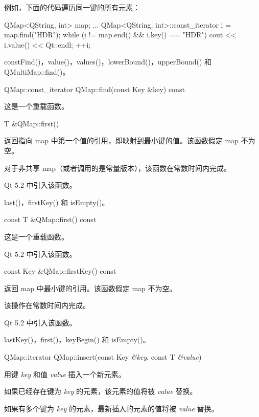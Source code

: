 例如，下面的代码遍历同一键的所有元素：

\begin{cppcode}
QMap<QString, int> map;
...
QMap<QString, int>::const_iterator i = map.find("HDR");
while (i != map.end() && i.key() == "HDR") {
    cout << i.value() << Qt::endl;
    ++i;
}
\end{cppcode}

\begin{seeAlso}
constFind()，value()，values()，lowerBound()，upperBound() 和 QMultiMap::find()。
\end{seeAlso}

\splitLine

QMap::const\_iterator QMap::find(const Key \&key) const

这是一个重载函数。

\splitLine

T \&QMap::first()

返回指向 map 中第一个值的引用，即映射到最小键的值。该函数假定 map 不为空。

对于非共享 map（或者调用的是常量版本），该函数在常数时间内完成。

Qt 5.2 中引入该函数。


\begin{seeAlso}
last()，firstKey() 和 isEmpty()。
\end{seeAlso}

\splitLine

const T \&QMap::first() const

这是一个重载函数。

Qt 5.2 中引入该函数。

\splitLine

const Key \&QMap::firstKey() const

返回 map 中最小键的引用。该函数假定 map 不为空。

该操作在常数时间内完成。

Qt 5.2 中引入该函数。


\begin{seeAlso}
lastKey()，first()，keyBegin() 和 isEmpty()。
\end{seeAlso}

\splitLine

QMap::iterator QMap::insert(const Key \emph{\&key}, const T \emph{\&value})

用键 \emph{key} 和值 \emph{value} 插入一个新元素。

如果已经存在键为 \emph{key} 的元素，该元素的值将被 \emph{value} 替换。

如果有多个键为 \emph{key} 的元素，最新插入的元素的值将被 \emph{value} 替换。

